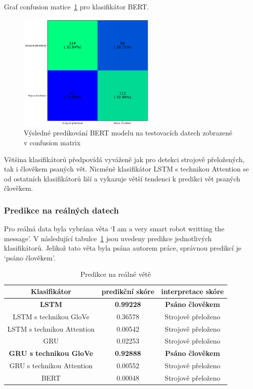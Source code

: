 Graf confusion matice~\ref{fig:EN BERT model conf} pro klasifikátor BERT.\@
\begin{figure}[H]
	\centering
	\includegraphics[width=0.6\textwidth]{Figures/EN_BERT_conf.png}
	\caption{Výsledné predikování BERT modelu na testovacích datech zobrazené v confusion matrix}\label{fig:EN BERT model conf}
\end{figure}

Většina klasifikátorů předpovídá vyváženě jak pro detekci strojově přeložených, tak i člověkem psaných vět.
Nicméně klasifikátor LSTM s technikou Attention se od ostatních klasifikátorů liší a vykazuje větší tendenci k predikci vět psaných člověkem.

\subsubsection{Predikce na reálných datech}
Pro reálná data byla vybrána věta `I am a very smart robot writting the message'.
V následující tabulce~\ref{tab:EN predikce} jsou uvedeny predikce jednotlivých klasifikátorů.
Jelikož tato věta byla psána autorem práce, správnou predikcí je `psáno člověkem'.

\begin{table}[H]
	\centering
	\caption{Predikce na reálné větě}\label{tab:EN predikce}
	\begin{tabular}{ c c c }
			\toprule
			Klasifikátor & predikční skóre & interpretace skóre\\
			\midrule
            \textbf{LSTM} & \textbf{0.99228} & \textbf{Psáno člověkem}\\
            LSTM s technikou GloVe & 0.36578 & Strojově přeloženo\\
            LSTM s technikou Attention & 0.00542 & Strojově přeloženo\\
            GRU & 0.02253 & Strojově přeloženo\\
            \textbf{GRU s technikou GloVe} & \textbf{0.92888} & \textbf{Psáno člověkem}\\
            GRU s technikou Attention & 0.00552 & Strojově přeloženo\\
            BERT & 0.00048 & Strojově přeloženo\\
			\midrule
		\end{tabular}
\end{table}

